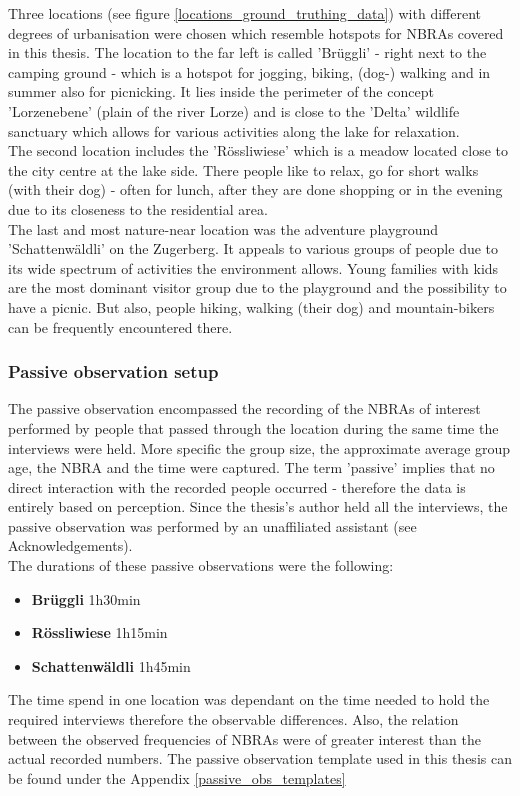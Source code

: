 Three locations (see figure \ref{locations_ground_truthing_data}) with different degrees of urbanisation were chosen which resemble hotspots for NBRAs covered in this thesis. The location to the far left is called 'Br\"uggli' - right next to the camping ground - which is a hotspot for jogging, biking, (dog-) walking and in summer also for picnicking. It lies inside the perimeter of the concept 'Lorzenebene' (plain of the river Lorze) and is close to the 'Delta' wildlife sanctuary which allows for various activities along the lake for relaxation.\\
The second location includes the 'R\"ossliwiese' which is a meadow located close to the city centre at the lake side. There people like to relax, go for short walks (with their dog) - often for lunch, after they are done shopping or in the evening due to its closeness to the residential area.\\
The last and most nature-near location was the adventure playground 'Schattenw\"aldli' on the Zugerberg. It appeals to various groups of people due to its wide spectrum of activities the environment allows. Young families with kids are the most dominant visitor group due to the playground and the possibility to have a picnic. But also, people hiking, walking (their dog) and mountain-bikers can be frequently encountered there.

\subsubsection{Passive observation setup} \label{passive_observation_setup}
The passive observation encompassed the recording of the NBRAs of interest performed by people that passed through the location during the same time the interviews were held. More specific the group size, the approximate average group age, the NBRA and the time were captured. The term 'passive' implies that no direct interaction with the recorded people occurred - therefore the data is entirely based on perception.
Since the thesis's author held all the interviews, the passive observation was performed by an unaffiliated assistant (see Acknowledgements).\\
The durations of these passive observations were the following:
\begin{itemize}
    \item \textbf{Br\"uggli} 1h30min
    \item \textbf{R\"ossliwiese} 1h15min
    \item \textbf{Schattenw\"aldli} 1h45min
\end{itemize}
The time spend in one location was dependant on the time needed to hold the required interviews therefore the observable differences. Also, the relation between the observed frequencies of NBRAs were of greater interest than the actual recorded numbers.
The passive observation template used in this thesis can be found under the Appendix \ref{passive_obs_templates}

